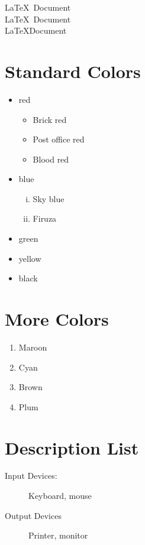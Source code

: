 \documentclass{article}
\begin{document}
	\lipsum[2-2]
	\vfill
	
	\lipsum[2-2]

	\pagebreak
	
	\noindent
	\LaTeX \ Document \\	
	\LaTeX \, Document \\	
	\LaTeX \hfill Document \\
	
	\renewcommand{\labelitemi}{$\diamond$}
	\renewcommand{\labelitemii}{$\blacksquare$}
	\section{Standard Colors}
	\begin{itemize}
		\item red
		\begin{itemize}
			\item Brick red
			\item Post office red
			\item Blood red
		\end{itemize}
		\item blue
		\begin{enumerate}[i.]
			\item Sky blue
			\item Firuza
		\end{enumerate}
		\item green
		\item yellow
		\item black
	\end{itemize}
	
	\section{More Colors}
	\begin{enumerate}
		\item Maroon
		\item Cyan
		\item Brown
		\item Plum
	\end{enumerate}
	
	\section{Description List}
	\begin{description}
		\item[Input Devices:] Keyboard, mouse
		\item[Output Devices] Printer, monitor
	\end{description}
\end{document}
